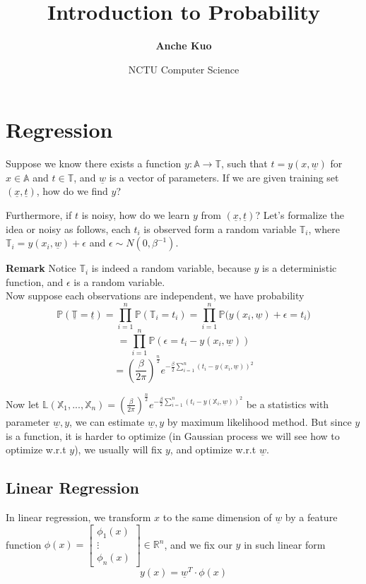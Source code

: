 \documentclass[12pt,a4paper,fleqn]{article}
\title{\textbf{Introduction to Probability}}
\author{\textbf{Anche Kuo}}
\date{NCTU Computer Science}
\begin{document}


\section{Regression}

Suppose we know there exists a function $y: \mathbb{A} \to \mathbb{T}$, such that $t = y(x, \underline{w})$ for $x \in \mathbb{A}$ and $t \in  \mathbb{T}$, and $\underline{w}$ is a vector of parameters. If we are given training set $(\underline{x}, \underline{t})$, how do we find $y$?

Furthermore, if $t$ is noisy, how do we learn $y$ from $(\underline{x}, \underline{t})$? Let's formalize the idea or noisy as follows, each $t_i$ is observed form a random variable $\mathbb{T}_i$, where $\mathbb{T}_i = y(x_i, \underline{w}) + \epsilon$ and $\epsilon \sim N(0, \beta^{-1})$.

\textbf{Remark} Notice $\mathbb{T}_i$ is indeed a random variable, because $y$ is a deterministic function, and $\epsilon$ is a random variable.\\

Now suppose each observations are independent, we have probability
$$\mathbb{P}(\underline{\mathbb{T}} = \underline{t}) = \prod_{i=1}^n \mathbb{P}(\mathbb{T}_i = t_i)
= \prod_{i=1}^n \mathbb{P}\Big(y(x_i, \underline{w}) + \epsilon = t_i \Big)$$
$$= \prod_{i=1}^n \mathbb{P}(\epsilon = t_i - y(x_i, \underline{w}))$$
$$= (\frac{\beta}{2\pi})^{\frac{n}{2}} e^{-\frac{\beta}{2}\sum_{i=1}^{n}(t_i - y(x_i, \underline{w}))^2}$$

Now let $\mathbb{L}(\mathbb{X}_1, ..., \mathbb{X}_n) = (\frac{\beta}{2\pi})^{\frac{n}{2}} e^{-\frac{\beta}{2}\sum_{i=1}^{n}(t_i - y(\mathbb{X}_i, \underline{w}))^2}$ be a statistics with parameter $\underline{w}, y$, we can estimate $\underline{w}, y$ by maximum likelihood method. But since $y$ is a function, it is harder to optimize (in Gaussian process we will see how to optimize w.r.t $y$), we usually will fix $y$, and optimize w.r.t $\underline{w}$.

\subsection{Linear Regression}
In linear regression, we transform $x$ to the same dimension of $\underline{w}$ by a feature function $\phi(x) = \begin{bmatrix} \phi_1(x) \\ \vdots \\ \phi_n(x) \end{bmatrix} \in \mathbb{R}^n$, and we fix our $y$ in such linear form
$$y(x) = \underline{w}^T \cdot \phi(x) $$
\end{document}
